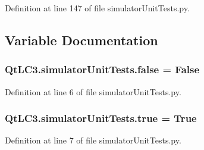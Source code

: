 Definition at line 147 of file simulator\-Unit\-Tests.\-py.



\subsection{Variable Documentation}
\hypertarget{namespace_qt_l_c3_1_1simulator_unit_tests_a762ffb74f9f8e380299cd1c525932310}{
\subsubsection[{false}]{\setlength{\rightskip}{0pt plus 5cm}Qt\-L\-C3.\-simulator\-Unit\-Tests.\-false = False}}\label{namespace_qt_l_c3_1_1simulator_unit_tests_a762ffb74f9f8e380299cd1c525932310}


Definition at line 6 of file simulator\-Unit\-Tests.\-py.

\hypertarget{namespace_qt_l_c3_1_1simulator_unit_tests_ac23f444832b767cf808b54d5d6f4bd72}{
\subsubsection[{true}]{\setlength{\rightskip}{0pt plus 5cm}Qt\-L\-C3.\-simulator\-Unit\-Tests.\-true = True}}\label{namespace_qt_l_c3_1_1simulator_unit_tests_ac23f444832b767cf808b54d5d6f4bd72}


Definition at line 7 of file simulator\-Unit\-Tests.\-py.

